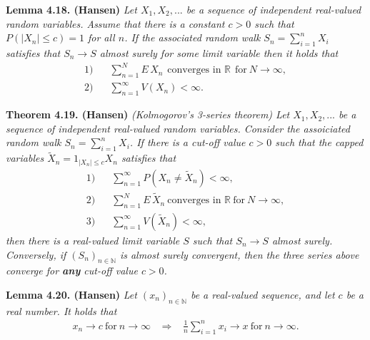 \documentclass[a4paper,12pt,openany]{book}
\begin{document}
\textbf{Lemma 4.18. (Hansen)} \emph{Let \(X_1,X_2,...\) be a sequence of independent real-valued random variables. Assume that there is a constant \(c>0\) such that \(P(\vert X_n\vert \le c)=1\) for all \(n\). If the associated random walk \(S_n=\sum_{i=1}^n X_i\) satisfies that \(S_n\to S\) almost surely for some limit variable then it holds that}
\begin{align}
    \text{1)}\hspace{10pt}& \sum_{n=1}^NE\, X_n\hspace{5pt}\text{converges in }\mathbb{R}\hspace{5pt}\text{for}\ N\to \infty,\\
    \text{2)}\hspace{10pt}&\sum_{n=1}^\infty V(X_n)<\infty.
\end{align}

\textbf{Theorem 4.19. (Hansen)} \emph{(Kolmogorov's 3-series theorem) Let \(X_1,X_2,...\) be a sequence of independent real-valued random variables. Consider the assoiciated random walk \(S_n=\sum_{i=1}^n X_i\). If there is a cut-off value \(c>0\) such that the capped variables \(\tilde{X}_n=1_{\vert X_n\vert \le c}X_n\) satisfies that}
\begin{align*}
    \text{1)}\hspace{10pt}& \sum_{n=1}^\infty P(X_n\ne \tilde{X}_n)<\infty,\\
    \text{2)}\hspace{10pt}& \sum_{n=1}^N E\, \tilde{X}_n\ \text{converges in }\mathbb{R}\ \text{for}\ N\to \infty,\\
    \text{3)}\hspace{10pt}& \sum_{n=1}^\infty V(\tilde{X}_n)<\infty,
\end{align*}
\emph{then there is a real-valued limit variable \(S\) such that \(S_n\to S\) almost surely.}
\emph{Conversely, if \((S_n)_{n\in\mathbb{N}}\) is almost surely convergent, then the three series above converge for \textbf{any} cut-off value \(c>0\).}

\textbf{Lemma 4.20. (Hansen)} \emph{Let \((x_n)_{n\in\mathbb{N}}\) be a real-valued sequence, and let \(c\) be a real number. It holds that}
\begin{align*}
    x_n\to c\ \text{for}\ n\to \infty \hspace{10pt}\Rightarrow\hspace{10pt} \frac{1}{n}\sum_{i=1}^nx_i\to x\ \text{for}\ n\to\infty.
\end{align*}
\end{document}
